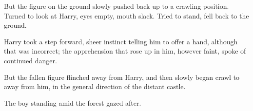 But the figure on the ground slowly pushed back up to a crawling position. Turned to look at Harry, eyes empty, mouth slack. Tried to stand, fell back to the ground.

Harry took a step forward, sheer instinct telling him to offer a hand, although that was incorrect; the apprehension that rose up in him, however faint, spoke of continued danger.

But the fallen figure flinched away from Harry, and then slowly began crawl to away from him, in the general direction of the distant castle.

The boy standing amid the forest gazed after.

